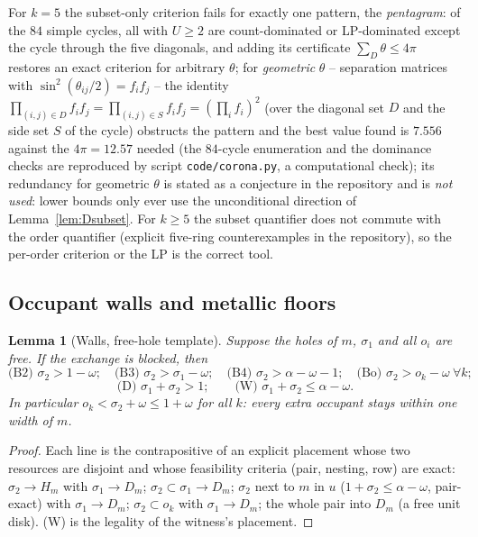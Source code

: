\documentclass[11pt]{article}
\newtheorem{lemma}[theorem]{Lemma}
\theoremstyle{definition}
\begin{document}
For $k=5$ the subset-only criterion fails for exactly one pattern, the
\emph{pentagram}: of the $84$ simple cycles, all with $U\ge2$ are
count-dominated or LP-dominated except the cycle through the five
diagonals, and adding its certificate $\sum_D\theta\le4\pi$ restores an
exact criterion for arbitrary $\theta$; for \emph{geometric} $\theta$ --
separation matrices with $\sin^2(\theta_{ij}/2)=f_i f_j$ -- the identity
$\prod_{(i,j)\in D}f_if_j=\prod_{(i,j)\in S}f_if_j=(\prod_i f_i)^2$
(over the diagonal set $D$ and the side set $S$ of the cycle) obstructs the
pattern and the best value found is $7.556$ against the $4\pi=12.57$
needed (the $84$-cycle enumeration and the dominance checks are
reproduced by script \texttt{code/corona.py}, a computational check); its redundancy for geometric $\theta$ is stated as a conjecture in
the repository and is \emph{not used}: lower bounds only ever use the
unconditional direction of Lemma~\ref{lem:Dsubset}. For $k\ge5$ the
subset quantifier does not commute with the order quantifier (explicit
five-ring counterexamples in the repository), so the per-order criterion
or the LP is the correct tool.

\subsection{Occupant walls and metallic floors}\label{app:walls-app}

\begin{lemma}[Walls, free-hole template]\label{lem:DV1}
Suppose the holes of $m$, $\sigma_1$ and all $o_i$ are free. If the
exchange is blocked, then
\[
\text{(B2) }\sigma_2>1-\omega;\quad
\text{(B3) }\sigma_2>\sigma_1-\omega;\quad
\text{(B4) }\sigma_2>\alpha-\omega-1;\quad
\text{(Bo) }\sigma_2>o_k-\omega\ \forall k;
\]
\[
\text{(D) }\sigma_1+\sigma_2>1;\qquad
\text{(W) }\sigma_1+\sigma_2\le\alpha-\omega.
\]
In particular $o_k<\sigma_2+\omega\le1+\omega$ for all $k$: every extra
occupant stays within one width of $m$.
\end{lemma}
\begin{proof}
Each line is the contrapositive of an explicit placement whose two
resources are disjoint and whose feasibility criteria (pair, nesting, row)
are exact: $\sigma_2\to H_m$ with $\sigma_1\to D_m$; $\sigma_2\subset
\sigma_1\to D_m$; $\sigma_2$ next to $m$ in $u$ ($1+\sigma_2\le
\alpha-\omega$, pair-exact) with $\sigma_1\to D_m$; $\sigma_2\subset o_k$
with $\sigma_1\to D_m$; the whole pair into $D_m$ (a free unit disk). (W)
is the legality of the witness's placement.
\end{proof}
\end{document}
